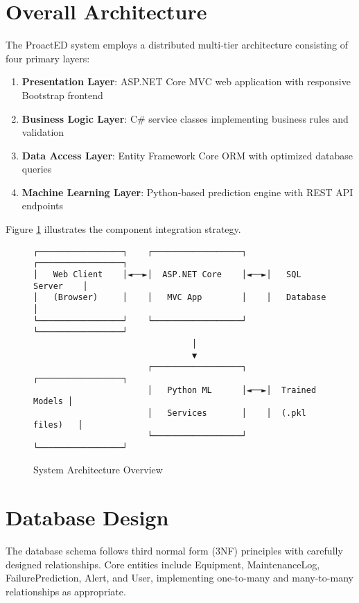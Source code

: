 \documentclass[12pt,a4paper]{report}
\begin{document}
\section{Overall Architecture}

The ProactED system employs a distributed multi-tier architecture consisting of four primary layers:

\begin{enumerate}
    \item \textbf{Presentation Layer}: ASP.NET Core MVC web application with responsive Bootstrap frontend
    \item \textbf{Business Logic Layer}: C\# service classes implementing business rules and validation
    \item \textbf{Data Access Layer}: Entity Framework Core ORM with optimized database queries
    \item \textbf{Machine Learning Layer}: Python-based prediction engine with REST API endpoints
\end{enumerate}

Figure \ref{fig:architecture} illustrates the component integration strategy.

\begin{figure}[H]
\centering
\begin{verbatim}
┌─────────────────┐    ┌──────────────────┐    ┌─────────────────┐
│   Web Client    │◄──►│  ASP.NET Core    │◄──►│   SQL Server    │
│   (Browser)     │    │   MVC App        │    │   Database      │
└─────────────────┘    └──────────────────┘    └─────────────────┘
                                │
                                ▼
                       ┌──────────────────┐    ┌─────────────────┐
                       │   Python ML      │◄──►│  Trained Models │
                       │   Services       │    │  (.pkl files)   │
                       └──────────────────┘    └─────────────────┘
\end{verbatim}
\caption{System Architecture Overview}
\label{fig:architecture}
\end{figure}

\section{Database Design}

The database schema follows third normal form (3NF) principles with carefully designed relationships. Core entities include Equipment, MaintenanceLog, FailurePrediction, Alert, and User, implementing one-to-many and many-to-many relationships as appropriate.
\end{document}
